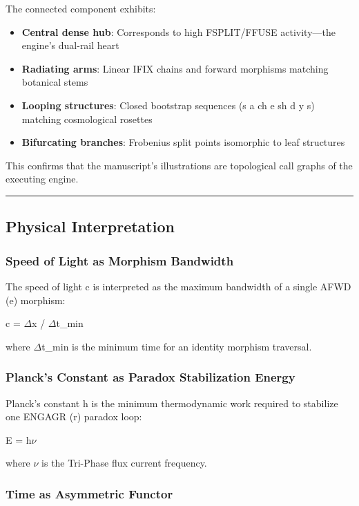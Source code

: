 \documentclass[12pt,a4paper]{article}
\begin{document}
The connected component exhibits:

\begin{itemize}
    \item \textbf{Central dense hub}: Corresponds to high FSPLIT/FFUSE activity---the engine's dual-rail heart
    \item \textbf{Radiating arms}: Linear IFIX chains and forward morphisms matching botanical stems
    \item \textbf{Looping structures}: Closed bootstrap sequences (s a ch e sh d y s) matching cosmological rosettes
    \item \textbf{Bifurcating branches}: Frobenius split points isomorphic to leaf structures
\end{itemize}

This confirms that the manuscript's illustrations are topological call graphs of the executing engine.

\begin{center}
\rule{0.5\textwidth}{0.4pt}
\end{center}

\subsection{Physical Interpretation}

\subsubsection{Speed of Light as Morphism Bandwidth}

The speed of light c is interpreted as the maximum bandwidth of a single AFWD (e) morphism:

c = $\Delta$x / $\Delta$t\_min

where $\Delta$t\_min is the minimum time for an identity morphism traversal.

\subsubsection{Planck's Constant as Paradox Stabilization Energy}

Planck's constant h is the minimum thermodynamic work required to stabilize one ENGAGR (r) paradox loop:

E = h$\nu$

where $\nu$ is the Tri-Phase flux current frequency.

\subsubsection{Time as Asymmetric Functor}
\end{document}

